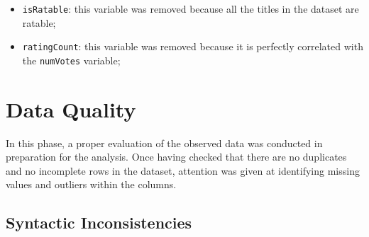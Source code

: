 \begin{itemize}
    \item \texttt{isRatable}: this variable was removed because all the titles in the dataset are ratable;
    \item \texttt{ratingCount}: this variable was removed because it is perfectly correlated with the \texttt{numVotes} variable;
\end{itemize}


\section{Data Quality}\label{sec:data_quality}
In this phase, a proper evaluation of the observed data was conducted in preparation for the analysis.
Once having checked that there are no duplicates and no incomplete rows in the dataset, 
attention was given at identifying missing values and outliers within the columns.



\subsection{Syntactic Inconsistencies}




